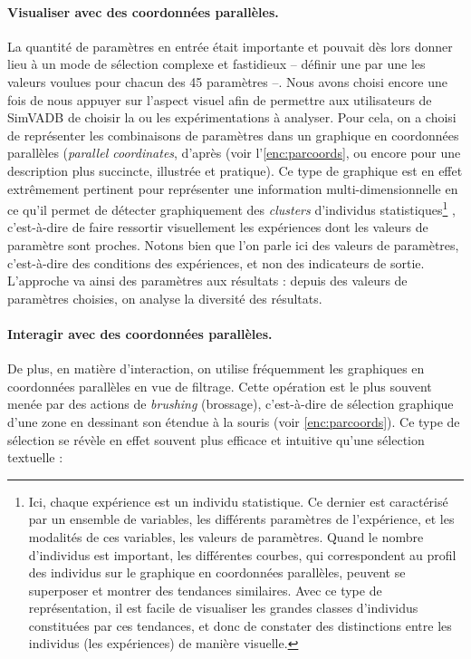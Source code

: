 \paragraph{Visualiser avec des coordonnées parallèles.}
La quantité de paramètres en entrée était importante et pouvait dès lors donner lieu à un mode de sélection complexe et fastidieux -- définir une par une les valeurs voulues pour chacun des 45 paramètres --.
Nous avons choisi encore une fois de nous appuyer sur l'aspect visuel afin de permettre aux utilisateurs de SimVADB de choisir la ou les expérimentations à analyser.
Pour cela, on a choisi de représenter les combinaisons de paramètres dans un graphique en \og coordonnées parallèles \fg{} (\textit{parallel coordinates}, d'après \cite{inselberg_parallel_1987} (voir l'\cref{enc:parcoords}, ou encore \cite{few_multivariate_2006} pour une description plus succincte, illustrée et pratique).
Ce type de graphique est en effet extrêmement pertinent pour représenter une information multi-dimensionnelle en ce qu'il permet de détecter graphiquement des \textit{clusters} d'individus statistiques\footnote{
	Ici, chaque expérience est un individu statistique.
	Ce dernier est caractérisé par un ensemble de variables, les différents paramètres de l'expérience, et les modalités de ces variables, les valeurs de paramètres.
	Quand le nombre d'individus est important, les différentes \og courbes\fg{}, qui correspondent au profil des individus sur le graphique en coordonnées parallèles, peuvent se superposer et montrer des tendances similaires.
	Avec ce type de représentation, il est facile de visualiser les grandes classes d'individus constituées par ces \og tendances\fg{}, et donc de constater des distinctions entre les individus (les expériences) de manière visuelle.
} \autocite[2]{heinrich_state_2013}, c'est-à-dire de faire ressortir visuellement les expériences dont les valeurs de paramètre sont proches.
Notons bien que l'on parle ici des valeurs de paramètres, c'est-à-dire des conditions des expériences, et non des indicateurs de sortie.
L'approche va ainsi des paramètres aux résultats : depuis des valeurs de paramètres choisies, on analyse la diversité des résultats.


\paragraph{Interagir avec des coordonnées parallèles.}
De plus, en matière d'interaction, on utilise fréquemment les graphiques en coordonnées parallèles en vue de filtrage.
Cette opération est le plus souvent menée par des actions de \textit{brushing} (\og brossage\fg{}), c'est-à-dire de sélection graphique d'une zone en dessinant son étendue à la souris (voir \cref{enc:parcoords}).
Ce type de sélection se révèle en effet souvent plus efficace et intuitive qu'une sélection textuelle :


